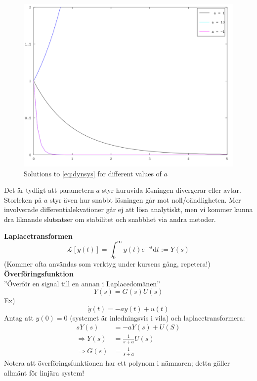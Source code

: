 \documentclass[12pt]{article}
\begin{document}
\begin{figure}[h!]
  \centering
  \includegraphics[width=\textwidth]{dynsys}
  \caption{Solutions to \eqref{eq:dynsys} for different values of $a$}
  \label{fig:dynsys}
\end{figure}
\FloatBarrier
Det är tydligt att parametern $a$ styr huruvida lösningen divergerar eller avtar. Storleken på $a$ styr även hur snabbt lösningen går mot noll/oändligheten. Mer involverade differentialekvationer går ej att lösa analytiskt, men vi kommer kunna dra liknande slutsatser om stabilitet och snabbhet via andra metoder.

\textbf{Laplacetransformen}
\begin{equation*}
\mathcal{L}[y(t)] = \int_{0}^{\infty}y(t)e^{-st}\mathrm{d}t := Y(s)
\end{equation*}
(Kommer ofta användas som verktyg under kursens gång, repetera!) \\
\textbf{Överföringsfunktion} \\
''Överför en signal till en annan i Laplacedomänen'' \\
\begin{equation*}
  Y(s) = G(s)U(s)
\end{equation*}
Ex) \\
\begin{equation*}
  \dot{y}(t) = -ay(t) + u(t)
\end{equation*}
Antag att $y(0) = 0$ (systemet är inledningsvis i vila) och laplacetransformera:
\begin{align*}
  sY(s) &= -aY(s) + U(S) \\
\Rightarrow Y(s) &= \frac{1}{s+a}U(s) \\
\Rightarrow G(s) &= \frac{1}{s+a}
\end{align*}
Notera att överföringsfunktionen har ett polynom i nämnaren; detta gäller allmänt för linjära system!
\end{document}
